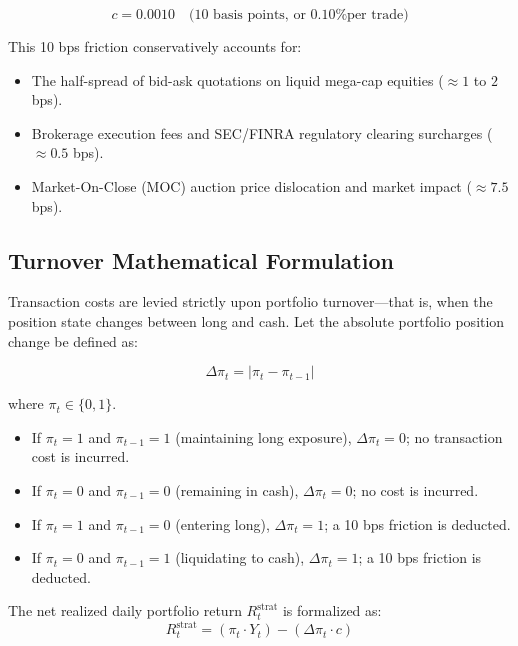 \documentclass[12pt, a4paper]{article}
\begin{document}
\begin{equation}
c = 0.0010 \quad \text{(10 basis points, or 0.10\% per trade)}
\end{equation}

This 10 bps friction conservatively accounts for:
\begin{itemize}
    \item The half-spread of bid-ask quotations on liquid mega-cap equities ($\approx 1$ to $2$ bps).
    \item Brokerage execution fees and SEC/FINRA regulatory clearing surcharges ($\approx 0.5$ bps).
    \item Market-On-Close (MOC) auction price dislocation and market impact ($\approx 7.5$ bps).
\end{itemize}


\subsection{Turnover Mathematical Formulation}

Transaction costs are levied strictly upon portfolio turnover---that is, when the position state changes between long and cash. Let the absolute portfolio position change be defined as:

\begin{equation}
\Delta\pi_t = |\pi_t - \pi_{t-1}|
\end{equation}

where $\pi_t \in \{0, 1\}$. 
\begin{itemize}
    \item If $\pi_t = 1$ and $\pi_{t-1} = 1$ (maintaining long exposure), $\Delta\pi_t = 0$; no transaction cost is incurred.
    \item If $\pi_t = 0$ and $\pi_{t-1} = 0$ (remaining in cash), $\Delta\pi_t = 0$; no cost is incurred.
    \item If $\pi_t = 1$ and $\pi_{t-1} = 0$ (entering long), $\Delta\pi_t = 1$; a 10 bps friction is deducted.
    \item If $\pi_t = 0$ and $\pi_{t-1} = 1$ (liquidating to cash), $\Delta\pi_t = 1$; a 10 bps friction is deducted.
\end{itemize}

The net realized daily portfolio return $R_{t}^{\text{strat}}$ is formalized as:
\begin{equation}
R_{t}^{\text{strat}} = \left(\pi_t \cdot Y_t \right) - \left( \Delta\pi_t \cdot c \right)
\end{equation}
\end{document}
